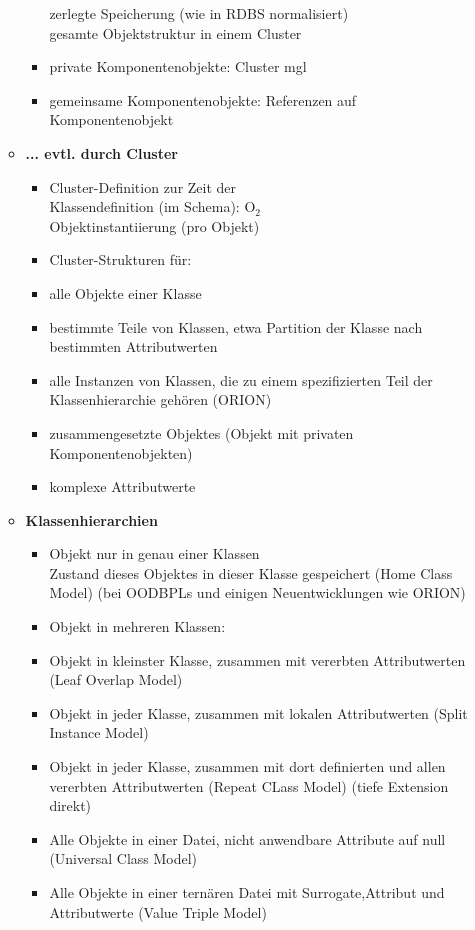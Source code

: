 \begin{itemize}
\begin{itemize}
\begin{itemize}
			zerlegte Speicherung (wie in RDBS normalisiert)\\
			gesamte Objektstruktur in einem Cluster
			\item private Komponentenobjekte: Cluster mgl
			\item gemeinsame Komponentenobjekte: Referenzen auf Komponentenobjekt
		\end{itemize}
		\item \textbf{... evtl. durch Cluster}
		\begin{itemize}
			\item Cluster-Definition zur Zeit der\\
			Klassendefinition (im Schema): O$_2$\\
			Objektinstantiierung (pro Objekt)
			\item Cluster-Strukturen für:
			\item alle Objekte einer Klasse
			\item bestimmte Teile von Klassen, etwa Partition der Klasse nach bestimmten Attributwerten
			\item alle Instanzen von Klassen, die zu einem spezifizierten Teil der Klassenhierarchie gehören (ORION)
			\item zusammengesetzte Objektes (Objekt mit privaten Komponentenobjekten)
			\item komplexe Attributwerte
		\end{itemize}
		\item \textbf{Klassenhierarchien}
		\begin{itemize}
			\item Objekt nur in genau einer Klassen\\
			Zustand dieses Objektes in dieser Klasse gespeichert (Home Class Model) (bei OODBPLs und einigen Neuentwicklungen wie ORION)
			\item Objekt in mehreren Klassen:
			\item Objekt in kleinster Klasse, zusammen mit vererbten Attributwerten (Leaf Overlap Model)
			\item Objekt in jeder Klasse, zusammen mit lokalen Attributwerten (Split Instance Model)
			\item Objekt in jeder Klasse, zusammen mit dort definierten und allen vererbten Attributwerten (Repeat CLass Model) (tiefe Extension direkt)
			\item Alle Objekte in einer Datei, nicht anwendbare Attribute auf null (Universal Class Model)
			\item Alle Objekte in einer ternären Datei mit Surrogate,Attribut und Attributwerte (Value Triple Model)
		\end{itemize}
	\end{itemize}
	

\end{itemize}
